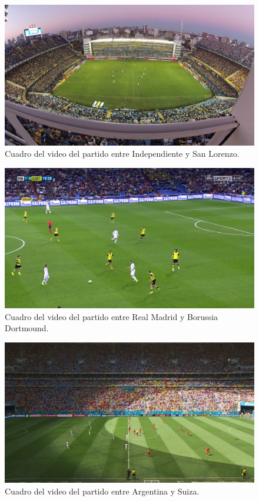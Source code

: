 \begin{appendices}
\begin{figure}[H]
  \centering
  \includegraphics[width=\linewidth]{./images/boca-figura.png}
  \caption{Cuadro del video del partido entre Independiente y San Lorenzo.}
\end{figure}

\begin{figure}[H]
  \centering
  \includegraphics[width=\linewidth]{./images/realmadrid1.png}
  \caption{Cuadro del video del partido entre Real Madrid y Borussia Dortmound.}
\end{figure}

\begin{figure}[H]
  \centering
  \includegraphics[width=\linewidth]{./images/argentina1.png}
  \caption{Cuadro del video del partido entre Argentina y Suiza.}
\end{figure}


\end{appendices}
